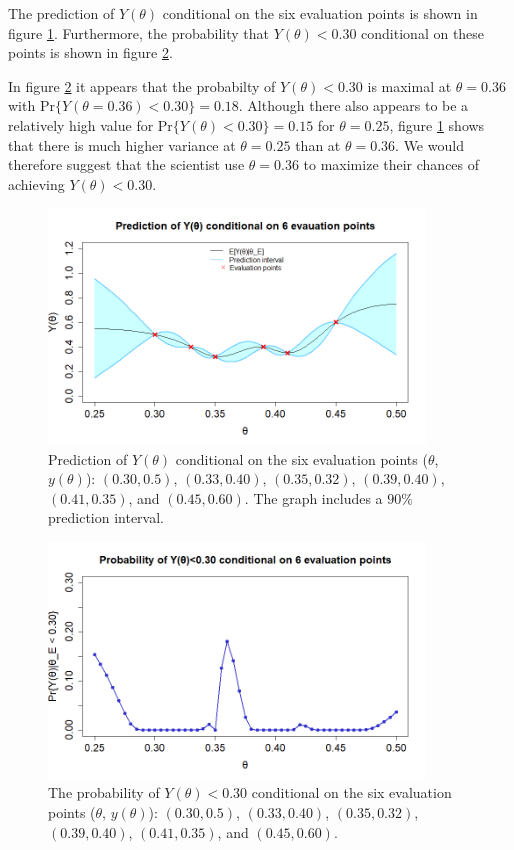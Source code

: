 The prediction of $Y(\theta)$ conditional on the six evaluation points is shown in figure \ref{2cPred}. Furthermore, the probability that $Y(\theta)<0.30$ conditional on these points is shown in figure \ref{2cTheta}. 

In figure \ref{2cTheta} it appears that the probabilty of $Y(\theta)<0.30$  is maximal at $\theta = 0.36$ with $\text{Pr}\{Y(\theta=0.36)<0.30\}=0.18$. Although there also appears to be a relatively high value for $\text{Pr}\{Y(\theta)<0.30\}=0.15$ for $\theta=0.25$, figure \ref{2cPred} shows that there is much higher variance at $\theta=0.25$ than at $\theta = 0.36$. We would therefore suggest that the scientist use $\theta = 0.36$ to maximize their chances of achieving $Y(\theta)<0.30$.

\begin{figure}
    \centering
    \includegraphics[width=100mm]{2cPred.png}
    \caption{Prediction of $Y(\theta)$ conditional on the six evaluation points  ($\theta$, $y(\theta)$): $(0.30,0.5)$, $(0.33, 0.40)$, $(0.35,0.32)$, $(0.39,0.40)$, $(0.41,0.35)$, and $(0.45,0.60)$. The graph includes a $90\%$ prediction interval. }
    \label{2cPred}
\end{figure}
\begin{figure}
    \centering
    \includegraphics[width=100mm]{2ctheta.png}
    \caption{The probability of $Y(\theta)<0.30$ conditional on the six evaluation points ($\theta$, $y(\theta)$): $(0.30,0.5)$, $(0.33, 0.40)$, $(0.35,0.32)$, $(0.39,0.40)$, $(0.41,0.35)$, and $(0.45,0.60)$.}
    \label{2cTheta}
\end{figure}
